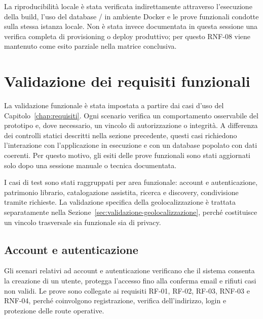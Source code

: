 %
%
%
%

La riproducibilità locale è stata verificata indirettamente attraverso l'esecuzione della build, l'uso del database \postgresql{}/\postgis{} in ambiente Docker e le prove funzionali condotte sulla stessa istanza locale. Non è stata invece documentata in questa sessione una verifica completa di provisioning o deploy produttivo; per questo RNF-08 viene mantenuto come esito parziale nella matrice conclusiva.

\section{Validazione dei requisiti funzionali}
\label{sec:validazione-funzionale}

La validazione funzionale è stata impostata a partire dai casi d'uso del Capitolo~\ref{chap:requisiti}. Ogni scenario verifica un comportamento osservabile del prototipo e, dove necessario, un vincolo di autorizzazione o integrità. A differenza dei controlli statici descritti nella sezione precedente, questi casi richiedono l'interazione con l'applicazione in esecuzione e con un database popolato con dati coerenti. Per questo motivo, gli esiti delle prove funzionali sono stati aggiornati solo dopo una sessione manuale o tecnica documentata.

I casi di test sono stati raggruppati per area funzionale: account e autenticazione, patrimonio librario, catalogazione assistita, ricerca e discovery, condivisione tramite richieste. La validazione specifica della geolocalizzazione è trattata separatamente nella Sezione~\ref{sec:validazione-geolocalizzazione}, perché costituisce un vincolo trasversale sia funzionale sia di privacy.

\subsection{Account e autenticazione}
\label{subsec:test-auth}

Gli scenari relativi ad account e autenticazione verificano che il sistema consenta la creazione di un utente, protegga l'accesso fino alla conferma email e rifiuti casi non validi. Le prove sono collegate ai requisiti RF-01, RF-02, RF-03, RNF-03 e RNF-04, perché coinvolgono registrazione, verifica dell'indirizzo, login e protezione delle route operative.

